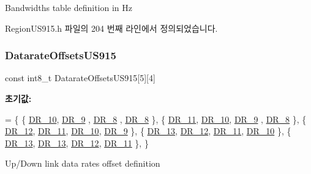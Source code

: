 Bandwidths table definition in Hz 

Region\+U\+S915.\+h 파일의 204 번째 라인에서 정의되었습니다.

\mbox{\label{group___r_e_g_i_o_n_u_s915_ga0eb65060b81a140baf62758bd288d073}} 
\subsubsection{\texorpdfstring{Datarate\+Offsets\+U\+S915}{DatarateOffsetsUS915}}
{\footnotesize\ttfamily const int8\+\_\+t Datarate\+Offsets\+U\+S915\mbox{[}5\mbox{]}\mbox{[}4\mbox{]}\hspace{0.3cm}{\ttfamily [static]}}

{\bfseries 초기값\+:}
\begin{DoxyCode}
=
\{
    \{ \mbox{\hyperlink{group___r_e_g_i_o_n_ga8cc471faabc38682537f6a60a30844e4}{DR\_10}}, \mbox{\hyperlink{group___r_e_g_i_o_n_ga67346d631ba28781d6dffb2a7b6fd22f}{DR\_9}} , \mbox{\hyperlink{group___r_e_g_i_o_n_ga44cc96ba80ae464cd9330b784d329c16}{DR\_8}} , \mbox{\hyperlink{group___r_e_g_i_o_n_ga44cc96ba80ae464cd9330b784d329c16}{DR\_8}}  \}, 
    \{ \mbox{\hyperlink{group___r_e_g_i_o_n_ga77672781eaa7dc6f6892195739a5ef27}{DR\_11}}, \mbox{\hyperlink{group___r_e_g_i_o_n_ga8cc471faabc38682537f6a60a30844e4}{DR\_10}}, \mbox{\hyperlink{group___r_e_g_i_o_n_ga67346d631ba28781d6dffb2a7b6fd22f}{DR\_9}} , \mbox{\hyperlink{group___r_e_g_i_o_n_ga44cc96ba80ae464cd9330b784d329c16}{DR\_8}}  \}, 
    \{ \mbox{\hyperlink{group___r_e_g_i_o_n_gafcf0cda11eda5db3d4c4e9a5bd79c0d5}{DR\_12}}, \mbox{\hyperlink{group___r_e_g_i_o_n_ga77672781eaa7dc6f6892195739a5ef27}{DR\_11}}, \mbox{\hyperlink{group___r_e_g_i_o_n_ga8cc471faabc38682537f6a60a30844e4}{DR\_10}}, \mbox{\hyperlink{group___r_e_g_i_o_n_ga67346d631ba28781d6dffb2a7b6fd22f}{DR\_9}}  \}, 
    \{ \mbox{\hyperlink{group___r_e_g_i_o_n_ga226f47470cc69a6fe831f7c92709bc1f}{DR\_13}}, \mbox{\hyperlink{group___r_e_g_i_o_n_gafcf0cda11eda5db3d4c4e9a5bd79c0d5}{DR\_12}}, \mbox{\hyperlink{group___r_e_g_i_o_n_ga77672781eaa7dc6f6892195739a5ef27}{DR\_11}}, \mbox{\hyperlink{group___r_e_g_i_o_n_ga8cc471faabc38682537f6a60a30844e4}{DR\_10}} \}, 
    \{ \mbox{\hyperlink{group___r_e_g_i_o_n_ga226f47470cc69a6fe831f7c92709bc1f}{DR\_13}}, \mbox{\hyperlink{group___r_e_g_i_o_n_ga226f47470cc69a6fe831f7c92709bc1f}{DR\_13}}, \mbox{\hyperlink{group___r_e_g_i_o_n_gafcf0cda11eda5db3d4c4e9a5bd79c0d5}{DR\_12}}, \mbox{\hyperlink{group___r_e_g_i_o_n_ga77672781eaa7dc6f6892195739a5ef27}{DR\_11}} \}, 
\}
\end{DoxyCode}
Up/\+Down link data rates offset definition 

